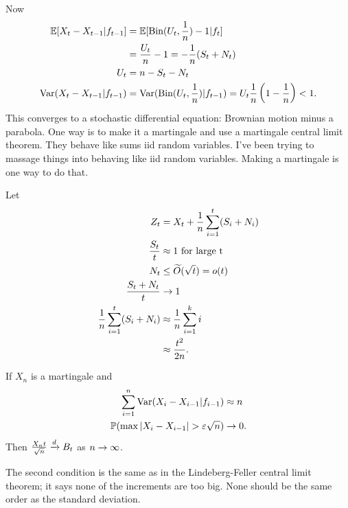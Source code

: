 Now
\begin{align}
\mathbb{E}[X_t-X_{t-1} | f_{t-1}]
&=\mathbb{E} [\text{Bin}(U_t,\frac{1}{n}) - 1|f_t]\\
&= \frac{U_t}{n} - 1 = -\frac{1}{n} (S_t+N_t)\\
U_t &=n-S_t-N_t\\
\operatorname{Var}(X_t-X_{t-1}|f_{t-1}) & = \operatorname{Var}(\text{Bin}(U_t,\frac{1}{n})|f_{t-1}) = U_t \frac{1}{n} \left( {1-\frac{1}{n}} \right)<1.
\end{align}
This converges to a stochastic differential equation: Brownian motion minus a parabola.
One way is to make it a martingale and use a martingale central limit theorem. They behave like sums iid random variables. I've been trying to massage things into behaving like iid random variables. Making a martingale is one way to do that.

Let 
\begin{align}
Z_t &= X_t + \frac{1}{n} \sum_{i=1}^{t} (S_i+N_i)\\
\frac{S_t}{t} &\approx 1 \text{ for large t}\\
N_t&\le \widetilde{O}(\sqrt t) = o(t)\\
\frac{S_t + N_t}{t} &\to 1\\
\frac{1}{n} \sum_{i=1}^{t} (S_i + N_i) &\approx \frac{1}{n} \sum_{i=1}^{k} i\\
&\approx \frac{t^2}{2n}.
\end{align}
\begin{thm}
If $X_n$ is a martingale and
\begin{align}
\sum_{i=1}^{n} \operatorname{Var}(X_i-X_{i-1}|f_{i-1})&\approx n\\
\mathbb{P}(\max|X_i-X_{i-1}| >\varepsilon \sqrt n)&\to 0.
\end{align}
Then $\frac{X_nt}{\sqrt n}\xrightarrow{d} B_t$ as $n\to \infty$.
\end{thm}
The second condition is the same as in the Lindeberg-Feller central limit theorem; it says  none of the increments are too big. None should be the same order as the standard deviation. 

